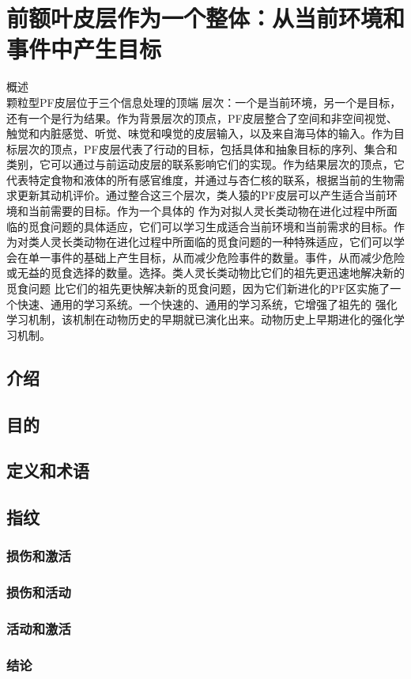 \chapter{前额叶皮层作为一个整体：从当前环境和事件中产生目标}
概述\\


颗粒型PF皮层位于三个信息处理的顶端 层次：一个是当前环境，另一个是目标，还有一个是行为结果。作为背景层次的顶点，PF皮层整合了空间和非空间视觉、触觉和内脏感觉、听觉、味觉和嗅觉的皮层输入，以及来自海马体的输入。作为目标层次的顶点，PF皮层代表了行动的目标，包括具体和抽象目标的序列、集合和类别，它可以通过与前运动皮层的联系影响它们的实现。作为结果层次的顶点，它代表特定食物和液体的所有感官维度，并通过与杏仁核的联系，根据当前的生物需求更新其动机评价。通过整合这三个层次，类人猿的PF皮层可以产生适合当前环境和当前需要的目标。作为一个具体的 作为对拟人灵长类动物在进化过程中所面临的觅食问题的具体适应，它们可以学习生成适合当前环境和当前需求的目标。作为对类人灵长类动物在进化过程中所面临的觅食问题的一种特殊适应，它们可以学会在单一事件的基础上产生目标，从而减少危险事件的数量。事件，从而减少危险或无益的觅食选择的数量。选择。类人灵长类动物比它们的祖先更迅速地解决新的觅食问题 比它们的祖先更快解决新的觅食问题，因为它们新进化的PF区实施了一个快速、通用的学习系统。一个快速的、通用的学习系统，它增强了祖先的 强化学习机制，该机制在动物历史的早期就已演化出来。动物历史上早期进化的强化学习机制。

\section{介绍}


\section{目的}

\section{定义和术语}


\section{指纹}

\subsection{损伤和激活}

\subsection{损伤和活动}

\subsection{活动和激活}




\subsection{结论}


